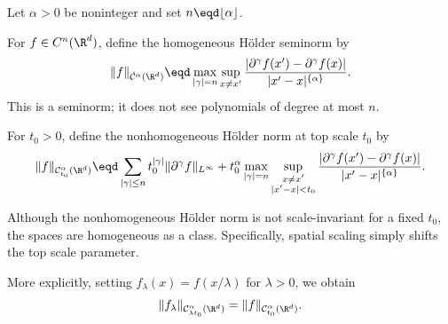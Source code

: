 \begin{definition} \label{def:holder-spaces} Let \(\alpha > 0\) be noninteger and set \(n\eqd \lfloor \alpha \rfloor\).

For \(f \in C^n(\R^d)\), define the homogeneous H{\"o}lder seminorm by
\begin{equation}
\label{eq:holder-homogeneous-seminorm}
\|f\|_{\dot{\mathcal{C}}^{\alpha}(\R^d)} \eqd
\max_{|\gamma|=n} \sup_{x \neq x'}
\frac{| \partial^\gamma f(x') - \partial^\gamma f(x) |} {|x'-x|^{\{\alpha\}}}.
\end{equation}
This is a seminorm; it does not see polynomials of degree at most \(n\).

For \(t_0>0\), define the nonhomogeneous H{\"o}lder norm at top scale \(t_0\) by
\begin{equation} \label{eq:holder-nonhomogeneous-top-scale-norm}
\|f\|_{\mathcal{C}^{\alpha}_{t_0}(\R^d)} \eqd
\sum_{|\gamma|\le n} t_0^{|\gamma|} \|\partial^\gamma f\|_{L^\infty}
+
t_0^\alpha
\max_{|\gamma|=n}
\sup_{\substack{x\neq x' \\ |x'-x|<t_0 }}
\frac{| \partial^\gamma f(x')-\partial^\gamma f(x)|} {|x'-x|^{\{\alpha\}}}.
\end{equation}
\end{definition}

\begin{remark} Although the nonhomogeneous H{\"o}lder norm is not scale-invariant for a fixed \(t_0\), the spaces are homogeneous as a class.
Specifically, spatial scaling simply shifts the top scale parameter.

More explicitly, setting \(f_\lambda(x) = f(x/\lambda)\) for \(\lambda > 0\), we obtain
\[
\|f_\lambda\|_{\mathcal{C}^{\alpha}_{\lambda t_0}(\R^d)}
=
\|f\|_{\mathcal{C}^{\alpha}_{t_0}(\R^d)}.
\]
\end{remark}

